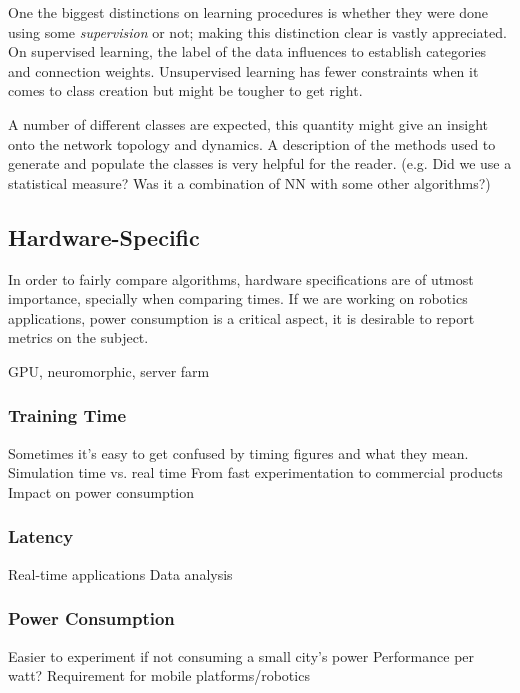 One the biggest distinctions on learning procedures is whether they were done using some \emph{supervision} or not; making this distinction clear is vastly appreciated. On supervised learning, the label of the data influences to establish categories and connection weights. Unsupervised learning has fewer constraints when it comes to class creation but might be tougher to get right. 

A number of different classes are expected, this quantity might give an insight onto the network topology and dynamics. A description of the methods used to generate and populate the classes is very helpful for the reader. (e.g. Did we use a statistical measure? Was it a combination of NN with some other algorithms?)


\subsection{Hardware-Specific}
In order to fairly compare algorithms, hardware specifications are of utmost importance, specially when comparing times. If we are working on robotics applications, power consumption is a critical aspect, it is desirable to report metrics on the subject.


GPU, neuromorphic, server farm

  \subsubsection{Training Time}
    Sometimes it's easy to get confused by timing figures and what they mean. 
    Simulation time vs. real time
    From fast experimentation to commercial products
    Impact on power consumption
  \subsubsection{Latency}
    Real-time applications
    Data analysis
  \subsubsection{Power Consumption}
    Easier to experiment if not consuming a small city's power
    Performance per watt?
    Requirement for mobile platforms/robotics
    
